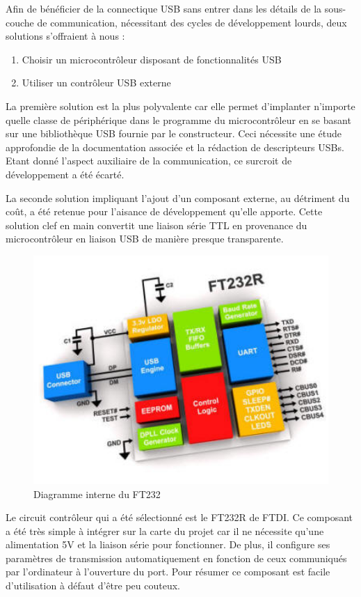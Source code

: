 \documentclass[11pt, french]{article} %
\begin{document}
	Afin de bénéficier de la connectique USB sans entrer dans les détails de la sous-couche de communication, nécessitant des cycles de développement lourds, deux solutions s'offraient à nous :

\medskip
\begin{enumerate}
	\item Choisir un microcontrôleur disposant de fonctionnalités USB
	\item Utiliser un contrôleur USB externe
\end{enumerate}

\medskip
La première solution est la plus polyvalente car elle permet d'implanter n'importe quelle classe de périphérique dans le programme du microcontrôleur en se basant sur une bibliothèque USB fournie par le constructeur. Ceci nécessite une étude approfondie de la documentation associée et la rédaction de descripteurs USBs. Etant donné l'aspect auxiliaire de la communication, ce surcroit de développement a été écarté.

La seconde solution impliquant l'ajout d'un composant externe, au détriment du coût, a été retenue pour l'aisance de développement qu'elle apporte. Cette solution clef en main convertit une liaison série TTL en provenance du microcontrôleur en liaison USB de manière presque transparente.

\begin{figure}[h!]
	\centering
	\includegraphics[width = 12cm]{SolutionNumerique/diagrammeFT232.jpg} 
	\caption{Diagramme interne du FT232}
\end{figure}

Le circuit contrôleur qui a été sélectionné est le FT232R de FTDI. Ce composant a été très simple à intégrer sur la carte du projet car il ne nécessite qu'une alimentation 5V et la liaison série pour fonctionner. De plus, il configure ses paramètres de transmission automatiquement en fonction de ceux communiqués par l'ordinateur à l'ouverture du port. Pour résumer ce composant est facile d'utilisation à défaut d'être peu couteux.
\end{document}
